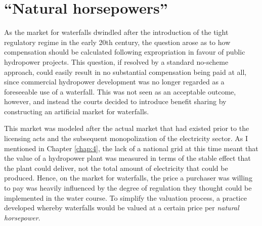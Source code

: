 \section{``Natural horsepowers''}

As the market for waterfalls dwindled after the introduction of the tight regulatory regime in the early 20th century, the question arose as to how compensation should be calculated following expropriation in favour of public hydropower projects. This question, if resolved by a standard no-scheme approach, could easily result in no substantial compensation being paid at all, since commercial hydropower development was no longer regarded as a foreseeable use of a waterfall. This was not seen as an acceptable outcome, however, and instead the courts decided to introduce benefit sharing by constructing an artificial market for waterfalls.

This market was modeled after the actual market that had existed prior to the licensing acts and the subsequent monopolization of the electricity sector. As I mentioned in Chapter \ref{chap:4}, the lack of a national grid at this time meant that the value of a hydropower plant was measured in terms of the stable effect that the plant could deliver, not the total amount of electricity that could be produced. Hence, on the market for waterfalls, the price a purchaser was willing to pay was heavily influenced by the degree of regulation they thought could be implemented in the water course. To simplify the valuation process, a practice developed whereby waterfalls would be valued at a certain price per {\it natural horsepower}.

